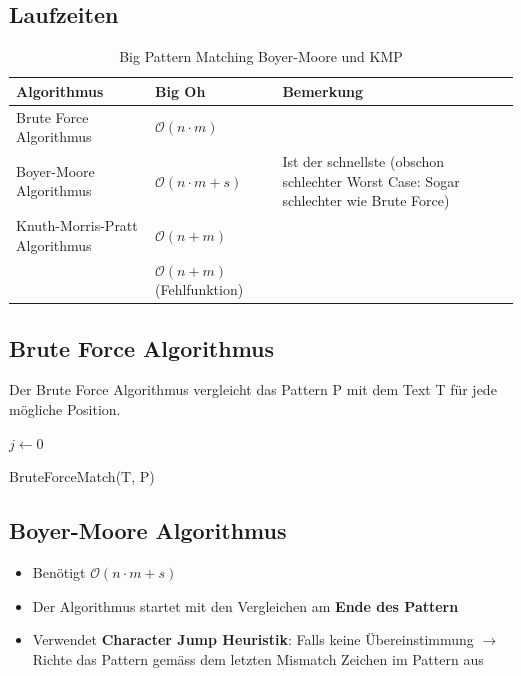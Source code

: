 \subsection{Laufzeiten}
\begin{table}[h]
	\centering
	\begin{tabu} to \linewidth {l l X}
		\toprule
		Algorithmus & Big Oh & Bemerkung \\
		\midrule
		Brute Force Algorithmus & $\mathcal{O}(n \cdot m)$ & \\
		Boyer-Moore Algorithmus & $\mathcal{O}(n \cdot m + s)$ & Ist der schnellste (obschon schlechter Worst Case: Sogar schlechter wie Brute Force) \\
		Knuth-Morris-Pratt Algorithmus & $\mathcal{O}(n+m)$ & \\
		& $\mathcal{O}(n+m)$ (Fehlfunktion)\\
		\bottomrule
	\end{tabu}
	\caption{Big Pattern Matching Boyer-Moore und KMP}
\end{table}

\subsection{Brute Force Algorithmus}
Der Brute Force Algorithmus vergleicht das Pattern P mit dem Text T für jede mögliche Position.
\begin{algorithm}[H]
	{
		$j \leftarrow 0$ \\

		 {
		}
	}
\caption{BruteForceMatch(T, P)}
\end{algorithm}


\subsection{Boyer-Moore Algorithmus}
\begin{itemize}
	\item Benötigt $\mathcal{O}(n\cdot m + s)$
	\item Der Algorithmus startet mit den Vergleichen am \textbf{Ende des Pattern}
	\item Verwendet \textbf{Character Jump Heuristik}: Falls keine Übereinstimmung $\rightarrow$ Richte das Pattern gemäss dem letzten Mismatch Zeichen im Pattern aus
\end{itemize}

